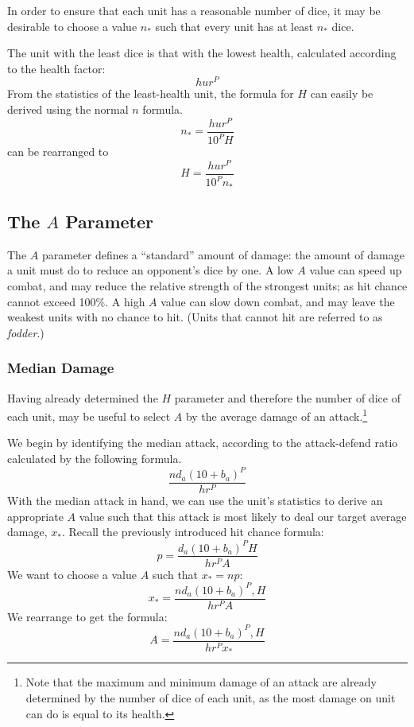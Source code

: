 \documentclass[twocolumn]{article}
\begin{document}
In order to ensure that each unit has a reasonable number of dice,
it may be desirable to choose a value $n_*$
such that every unit has at least $n_*$ dice.

The unit with the least dice is that with the lowest health,
calculated according to the health factor:
\[
    h u r^P
\]
From the statistics of the least-health unit, the formula for $H$
can easily be derived using the normal $n$ formula.
\[
    n_* =  
        \frac
            {h u r^P}
            {10^P H}
\]
can be rearranged to
\[
    H =  
        \frac
            {h u r^P}
            {10^P n_*}
\]


\subsection{The $A$ Parameter}

The $A$ parameter defines a ``standard'' amount of damage:
the amount of damage a unit must do to reduce an opponent's dice by one.
A low $A$ value can speed up combat,
and may reduce the relative strength of the strongest units;
as hit chance cannot exceed 100\%.
A high $A$ value can slow down combat,
and may leave the weakest units with no chance to hit.
(Units that cannot hit are referred to as \emph{fodder}.)

\subsubsection{Median Damage}

Having already determined the $H$ parameter and
therefore the number of dice of each unit,
may be useful to select $A$ by the average damage of an attack.\footnote{
    Note that the maximum and minimum damage of an attack
    are already determined by the number of dice of each unit,
    as the most damage on unit can do is equal to its health.
}

We begin by identifying the median attack,
according to the attack-defend ratio calculated by the following formula.
\[
    \frac
        {n d_a (10 + b_a)^P}
        {h r^P}
\]
With the median attack in hand,
we can use the unit's statistics to derive an appropriate $A$ value
such that this attack is most likely to deal our target average damage, $x_*$.
Recall the previously introduced hit chance formula:
\[
    p = \frac
        {d_a (10 + b_a)^P H}
        {h r^P A}
\]
We want to choose a value $A$ such that $x_* = n p$:
\[
    x_* = \frac
        {n d_a (10 + b_a)^P, H}
        {h r^P A}
\]
We rearrange to get the formula:
\[
    A = \frac
        {n d_a (10 + b_a)^P, H}
        {h r^P x_*}
\]
\end{document}
